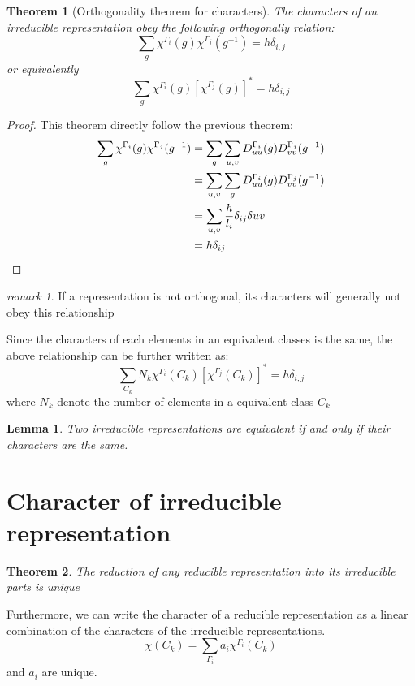 \documentclass{amsart}
\newtheorem*{theorem}{Theorem}
\newtheorem*{lemma}{Lemma}
\theoremstyle{remark}
\newtheorem*{remark}{remark}
\theoremstyle{remark}
\theoremstyle{definition}
\begin{document}
\begin{theorem}
    [Orthogonality theorem for characters]
    The characters of an irreducible representation obey the following orthogonaliy relation:
    \begin{equation*}
        \sum_g \chi^{\Gamma_i}(g) \chi^{\Gamma_j}(g^{-1}) = h \delta_{i,j} 
    \end{equation*}
    or equivalently
    \begin{equation*}
        \sum_g \chi^{\Gamma_i}(g) \left[\chi^{\Gamma_j}(g)\right]^* = h \delta_{i,j} 
    \end{equation*}
\end{theorem}
\begin{proof}
This theorem directly follow the previous theorem:
\begin{align*}
    \sum_g \chi^{\Gamma_i}(g) \chi^{\Gamma_j}(g^{-1})
    &= \sum_g \sum_{u,v} D^{\Gamma_i}_{uu}(g) D^{\Gamma_j}_{vv}(g^{-1}) \\
    &= \sum_{u,v} \sum_g D^{\Gamma_i}_{uu}(g) D^{\Gamma_j}_{vv}(g^{-1}) \\
    &= \sum_{u,v} \frac{h}{l_i} \delta_{ij} \delta{uv} \\
    &= h \delta_{ij} \qedhere
\end{align*}
\end{proof}
\begin{remark}
    If a representation is not orthogonal, its characters will generally not obey this relationship
\end{remark}
Since the characters of each elements in an equivalent classes is the same, the above relationship can be 
further written as:
\begin{equation*}
    \sum_{C_k} N_k\chi^{\Gamma_i}(C_k) \left[\chi^{\Gamma_j}(C_k)\right]^* = h \delta_{i,j} 
\end{equation*}
where $N_k$ denote the number of elements in a equivalent class $C_k$

\begin{lemma}
    Two irreducible representations are equivalent if and only if their characters are the same.
\end{lemma}

\vspace{10pt}
\section*{Character of irreducible representation}
\begin{theorem}
    The reduction of any reducible representation into its irreducible parts is unique
\end{theorem}
Furthermore, we can write the character of a reducible representation as a linear combination
of the characters of the irreducible representations.
\begin{equation*}
    \chi(C_k) = \sum_{\Gamma_i} a_i \chi^{\Gamma_i}(C_k)
\end{equation*}
and $a_i$ are unique.
\end{document}
